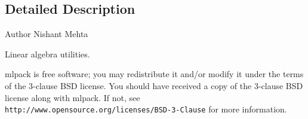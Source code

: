 \subsection{Detailed Description}
\begin{DoxyAuthor}{Author}
Nishant Mehta
\end{DoxyAuthor}
Linear algebra utilities.

mlpack is free software; you may redistribute it and/or modify it under the terms of the 3-\/clause B\+SD license. You should have received a copy of the 3-\/clause B\+SD license along with mlpack. If not, see {\tt http\+://www.\+opensource.\+org/licenses/\+B\+S\+D-\/3-\/\+Clause} for more information. 